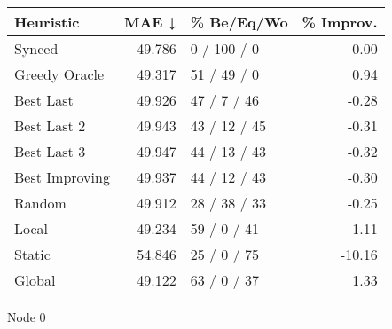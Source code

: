\begin{tabular}{lrlr}
\toprule
\textbf{Heuristic} & \textbf{MAE ↓} & \textbf{\% Be/Eq/Wo} & \textbf{\% Improv.} \\
\midrule
            Synced &         49.786 &          0 / 100 / 0 &                0.00 \\
     Greedy Oracle &         49.317 &          51 / 49 / 0 &                0.94 \\
         Best Last &         49.926 &          47 / 7 / 46 &               -0.28 \\
       Best Last 2 &         49.943 &         43 / 12 / 45 &               -0.31 \\
       Best Last 3 &         49.947 &         44 / 13 / 43 &               -0.32 \\
    Best Improving &         49.937 &         44 / 12 / 43 &               -0.30 \\
            Random &         49.912 &         28 / 38 / 33 &               -0.25 \\
             Local &         49.234 &          59 / 0 / 41 &                1.11 \\
            Static &         54.846 &          25 / 0 / 75 &              -10.16 \\
            Global &         49.122 &          63 / 0 / 37 &                1.33 \\
\bottomrule
\end{tabular}
\caption{Node 0}
\label{tab:iid_lr05_le1_bs4_0}
